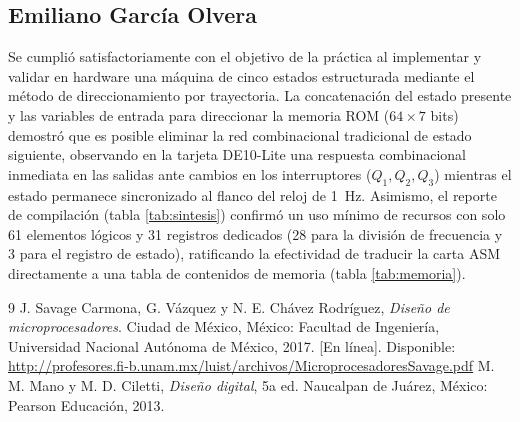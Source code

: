 \subsection{Emiliano García Olvera}

Se cumplió satisfactoriamente con el objetivo de la práctica al implementar y validar en hardware una máquina de cinco estados estructurada mediante el método de direccionamiento por trayectoria. La concatenación del estado presente y las variables de entrada para direccionar la memoria ROM ($64 \times 7$ bits) demostró que es posible eliminar la red combinacional tradicional de estado siguiente, observando en la tarjeta DE10-Lite una respuesta combinacional inmediata en las salidas ante cambios en los interruptores ($Q_1, Q_2, Q_3$) mientras el estado permanece sincronizado al flanco del reloj de 1~Hz. Asimismo, el reporte de compilación (tabla \ref{tab:sintesis}) confirmó un uso mínimo de recursos con solo 61 elementos lógicos y 31 registros dedicados (28 para la división de frecuencia y 3 para el registro de estado), ratificando la efectividad de traducir la carta ASM directamente a una tabla de contenidos de memoria (tabla \ref{tab:memoria}).

\renewcommand{\refname}{Bibliografía}
\begin{thebibliography}{9}
 J. Savage Carmona, G. Vázquez y N. E. Chávez Rodríguez,
  \emph{Diseño de microprocesadores}. Ciudad de México, México: Facultad de Ingeniería,
  Universidad Nacional Autónoma de México, 2017. [En línea]. Disponible:
  \url{http://profesores.fi-b.unam.mx/luist/archivos/MicroprocesadoresSavage.pdf}
 M. M. Mano y M. D. Ciletti, \emph{Diseño digital}, 5a ed.
  Naucalpan de Juárez, México: Pearson Educación, 2013.
\end{thebibliography}


